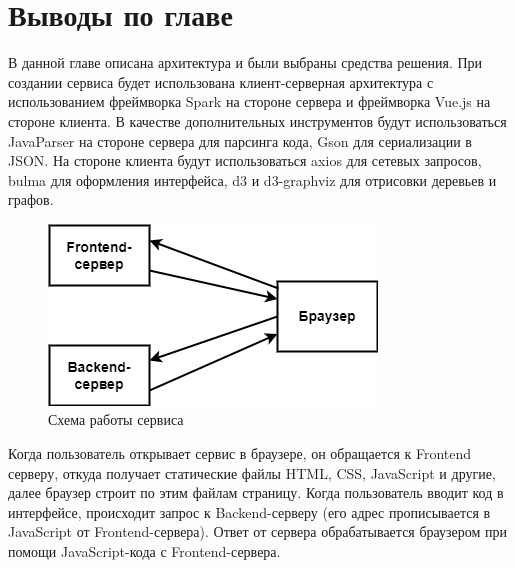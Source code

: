 \section{Выводы по главе} \label{ch4:sec6}
В данной главе описана архитектура и были выбраны средства решения. При создании сервиса будет использована клиент-серверная архитектура с использованием фреймворка Spark на стороне сервера и фреймворка Vue.js на стороне клиента. В качестве дополнительных инструментов будут использоваться JavaParser на стороне сервера для парсинга кода, Gson для сериализации в JSON. На стороне клиента будут использоваться axios для сетевых запросов, bulma для оформления интерфейса, d3 и d3-graphviz для отрисовки деревьев и графов.
\begin{figure}[ht!] 
	\center
	\includegraphics [scale=0.27] {my_folder/images/my/19}
	\caption{Схема работы сервиса} 
	\label{fig:19}  
\end{figure}
Когда пользователь открывает сервис в браузере, он обращается к Frontend серверу, откуда получает статические файлы HTML, CSS, JavaScript и другие, далее браузер строит по этим файлам страницу. Когда пользователь вводит код в интерфейсе, происходит запрос к Backend-серверу (его адрес прописывается в JavaScript от Frontend-сервера). Ответ от сервера обрабатывается браузером при помощи JavaScript-кода с Frontend-сервера.
\newpage















